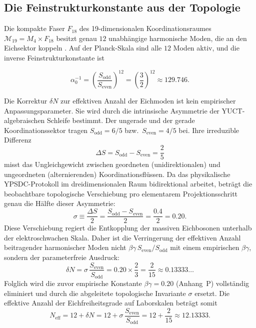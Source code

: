 \documentclass[12pt,a4paper]{article}
\theoremstyle{remark}
\begin{document}
	\subsection{Die Feinstrukturkonstante aus der Topologie}
	
	Die kompakte Faser \(F_{18}\) des 19-dimensionalen Koordinationsraumes
	\(\mathcal{M}_{19}=M_4\times F_{18}\) besitzt genau \(12\) unabhängige
	harmonische Moden, die an den Eichsektor koppeln \cite{AppendixG}. Auf der
	Planck-Skala sind alle \(12\) Moden aktiv, und die inverse Feinstrukturkonstante
	ist
	
	\begin{equation}
		\alpha_0^{-1} = \left(\frac{S_{\mathrm{odd}}}{S_{\mathrm{even}}}\right)^{12}
		= \left(\frac{3}{2}\right)^{12} \approx 129.746 .
	\end{equation}
	
	Die Korrektur \(\delta N\) zur effektiven Anzahl der Eichmoden ist kein
	empirischer Anpassungsparameter. Sie wird durch die intrinsische Asymmetrie
	der YUCT-algebraischen Schleife bestimmt. Der ungerade und der gerade
	Koordinationssektor tragen \(S_{\mathrm{odd}} = 6/5\) bzw.\ \(S_{\mathrm{even}} = 4/5\) bei.
	Ihre irreduzible Differenz
	\[
	\Delta S = S_{\mathrm{odd}} - S_{\mathrm{even}} = \frac{2}{5}
	\]
	misst das Ungleichgewicht zwischen geordneten (unidirektionalen) und
	ungeordneten (alternierenden) Koordinationsflüssen. Da das physikalische
	YPSDC-Protokoll im dreidimensionalen Raum bidirektional arbeitet, beträgt
	die beobachtbare topologische Verschiebung pro elementarem Projektionsschritt
	genau die Hälfte dieser Asymmetrie:
	\[
	\sigma \equiv \frac{\Delta S}{2} = \frac{S_{\mathrm{odd}} - S_{\mathrm{even}}}{2}
	= \frac{0.4}{2} = 0.20.
	\]
	Diese Verschiebung regiert die Entkopplung der massiven Eichbosonen unterhalb
	der elektroschwachen Skala. Daher ist die Verringerung der effektiven Anzahl
	beitragender harmonischer Moden nicht \(\beta\gamma\,S_{\mathrm{even}}/S_{\mathrm{odd}}\)
	mit einem empirischen \(\beta\gamma\), sondern der parameterfreie Ausdruck:
	\[
	\delta N = \sigma \, \frac{S_{\mathrm{even}}}{S_{\mathrm{odd}}}
	= 0.20 \times \frac{2}{3}
	= \frac{2}{15} \approx 0.13333\ldots
	\]
	Folglich wird die zuvor empirische Konstante \(\beta\gamma = 0.20\)
	(Anhang~P) vollständig eliminiert und durch die abgeleitete topologische
	Invariante \(\sigma\) ersetzt. Die effektive Anzahl der Eichfreiheitsgrade
	auf Laborskalen beträgt somit
	\[
	N_{\mathrm{eff}} = 12 + \delta N = 12 + \sigma\,\frac{S_{\mathrm{even}}}{S_{\mathrm{odd}}}
	= 12 + \frac{2}{15} \approx 12.13333 .
	\]
	
\end{document}
